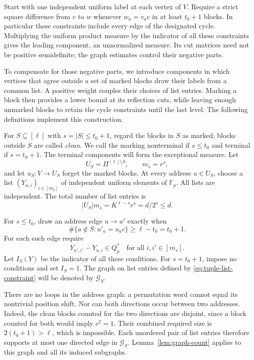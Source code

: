 Start with one independent uniform label at each vertex of $V$. Require a
strict square difference from $v$ to $w$ whenever $w_a=v_ac$ in at least
$t_0+1$ blocks. In particular these constraints include every edge of the
designated cycle. Multiplying the uniform product measure by the indicator
of all these constraints gives the leading component, an unnormalized
measure. Its cut matrices need not be positive semidefinite; the graph
estimates control their negative parts.

To compensate for those negative parts, we introduce components in which
vertices that agree outside a set of marked blocks draw their labels from
a common list. A positive weight couples their choices of list entries.
Marking a block then provides a lower bound at its reflection cuts, while
leaving enough unmarked blocks to retain the cycle constraints until the
last level. The following definitions implement this construction.

For \(S\subseteq[\ell]\) with \(s=|S|\le t_0+1\), regard the
blocks in \(S\) as marked; blocks outside \(S\) are called
\emph{clean}. We call the marking nonterminal if $s\le t_0$ and
terminal if $s=t_0+1$. The terminal components will form the exceptional
measure. Let
\[
 U_S=\Pi^{[\ell]\setminus S},\qquad m_s=r^s,
\]
and let \(u_S:V\to U_S\) forget the marked blocks.  At every
address \(u\in U_S\), choose a list
\((Y_{u,i})_{i\in[m_s]}\) of independent uniform elements of
\(\mathbb F_p\).  All lists are independent.  The total number of
list entries is
\begin{equation}
 |U_S|m_s=K^{\ell-s}r^s=d/2^s\le d.
 \label{eq:tuple-list-count}
\end{equation}

For \(s\le t_0\), draw an address edge \(u\to u'\) exactly when
\begin{equation}
 \#\{a\notin S:u'_a=u_ac\}\ge\ell-t_0=t_0+1.
 \label{eq:tuple-address-edge}
\end{equation}
For each such edge require
\begin{equation}
 Y_{u',i'}-Y_{u,i}\in Q_p^*
 \quad\text{for all }i,i'\in[m_s].
 \label{eq:tuple-list-constraint}
\end{equation}
Let \(I_S(Y)\) be the indicator of all these conditions.
For \(s=t_0+1\), impose no conditions and set \(I_S=1\).
The graph on list entries defined by
\eqref{eq:tuple-list-constraint} will be denoted by \(\mathcal G_S\).

There are no loops in the address graph: a permutation word cannot
equal its nontrivial position shift.  Nor can both directions occur
between two addresses.  Indeed, the clean blocks counted for the two
directions are disjoint, since a block counted for both would imply
\(c^2=1\).  Their combined required size is \(2(t_0+1)>\ell\),
which is impossible.  Each unordered pair of list entries therefore
supports at most one directed edge in \(\mathcal G_S\).
Lemma~\ref{lem:graph-count} applies to this graph and all its induced
subgraphs.

